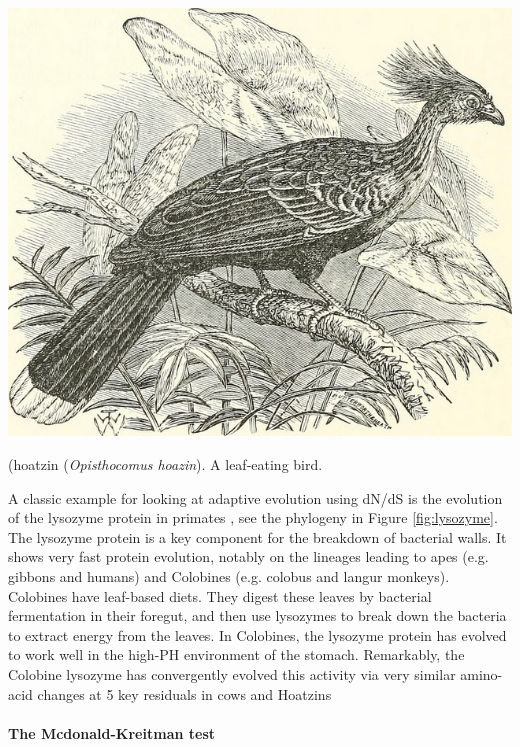 \begin{marginfigure}
\begin{center}
\includegraphics[width=0.8  \textwidth]{illustration_images/Genetic_drift/Hoatzin/14747388314_85798ba97e_z.jpg}
\end{center}
\caption{ (hoatzin ({\it Opisthocomus hoazin}). A leaf-eating bird. } \label{fig:hoatzin}  
\end{marginfigure} 
A classic example for looking at adaptive evolution using dN/dS is the
evolution of the lysozyme protein in primates \citep{Messier:97,Yang:98}, see
the phylogeny in Figure \ref{fig:lysozyme}. The lysozyme protein is
a key component for the breakdown of bacterial walls. It shows very
fast protein evolution, notably on the lineages leading to apes (e.g. gibbons
and humans) and Colobines (e.g. colobus and langur monkeys). Colobines have leaf-based diets. They digest
these leaves by bacterial fermentation in their foregut, and then use lysozymes to break down the bacteria to extract energy from the
leaves. In Colobines, the lysozyme protein has evolved to work well in the high-PH environment of the stomach. Remarkably, the Colobine
lysozyme has convergently evolved this activity via very similar amino-acid changes at 5 key residuals in cows and Hoatzins \citep[a leaf
eating bird,][]{kornegay1994molecular} 

\paragraph{The Mcdonald-Kreitman test}


